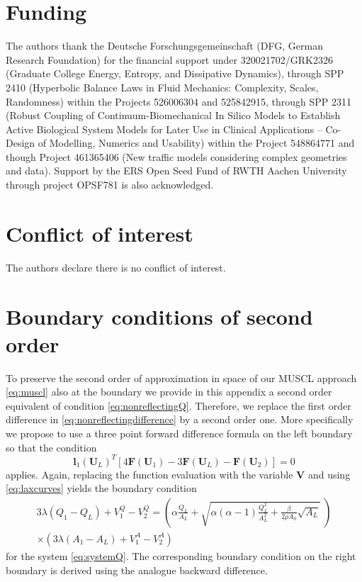 \documentclass[a4paper,11pt]{article}
\begin{document}
\section*{Funding}
The authors thank the Deutsche Forschungsgemeinschaft (DFG, German Research Foundation) for the financial support under 320021702/GRK2326 (Graduate College Energy, Entropy, and Dissipative Dynamics), through SPP 2410 (Hyperbolic Balance Laws in Fluid Mechanics: Complexity, Scales, Randomness) within the Projects 526006304 and 525842915, through SPP 2311 (Robust Coupling of Continuum-Biomechanical In Silico Models to Establish Active Biological System Models for Later Use in Clinical Applications – Co-Design of Modelling, Numerics and Usability) within the Project 548864771 and though Project 461365406 (New traffic models considering complex geometries and data). Support by the ERS Open Seed Fund of RWTH Aachen University through project OPSF781 is also acknowledged.

\section*{Conflict of interest}
The authors declare there is no conflict of interest.

 

\appendix

\section{Boundary conditions of second order}\label{sec:boundary2}
To preserve the second order of approximation in space of our MUSCL approach \eqref{eq:muscl} also at the boundary we provide in this appendix a second order equivalent of condition  \eqref{eq:nonreflectingQ}.
  Therefore, we replace the first order difference in \eqref{eq:nonreflectingdifference} by a second order one. More specifically we propose to use a three point forward difference formula on the left boundary so that the condition 
  \begin{equation*}
    \mathbf l_1(\mathbf U_L)^T [4\mathbf F(\mathbf U_1) - 3\mathbf F(\mathbf U_L) -\mathbf F(\mathbf U_2)]  = 0
  \end{equation*}
  applies. Again, replacing the function evaluation with the variable $\mathbf{V}$ and using \eqref{eq:laxcurves} yields the boundary condition
  \begin{equation*}
    \begin{split}
      3\lambda \left( Q_1 - Q_L \right) + V_1^Q - V_2^Q = \left(\alpha \frac{Q_L}{A_L}+ \sqrt{\alpha (\alpha -1) \frac{Q_L^2}{A_L^2} + \frac{\beta}{2 \rho A_0} \sqrt{A_L}}~\right) \\
      \times \left( 3\lambda \left( A_1 - A_L \right) + V_1^A - V_2^A \right)
    \end{split}
  \end{equation*}
  for the system \eqref{eq:systemQ}.
  The corresponding boundary condition on the right boundary is derived using the analogue backward difference.
\end{document}
